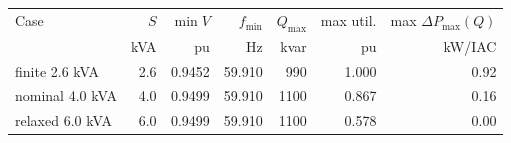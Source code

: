\begin{tabular}{lrrrrrr}
\toprule
Case & $S$ & $\min V$ & $f_{\min}$ & $Q_{\max}$ & max util. & max $\Delta P_{\max}(Q)$ \\
 & kVA & pu & Hz & kvar & pu & kW/IAC \\
\midrule
finite 2.6 kVA & 2.6 & 0.9452 & 59.910 & 990 & 1.000 & 0.92 \\
nominal 4.0 kVA & 4.0 & 0.9499 & 59.910 & 1100 & 0.867 & 0.16 \\
relaxed 6.0 kVA & 6.0 & 0.9499 & 59.910 & 1100 & 0.578 & 0.00 \\
\bottomrule
\end{tabular}
